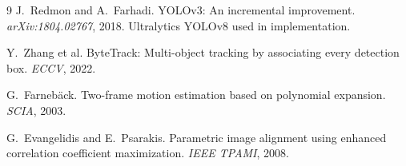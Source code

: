 \documentclass[10pt,twocolumn,letterpaper]{article}
\begin{document}
\begin{thebibliography}{9}
J.~Redmon and A.~Farhadi.
YOLOv3: An incremental improvement.
\emph{arXiv:1804.02767}, 2018.
Ultralytics YOLOv8 used in implementation.

Y.~Zhang et al.
ByteTrack: Multi-object tracking by associating every detection box.
\emph{ECCV}, 2022.

G.~Farneb{\"a}ck.
Two-frame motion estimation based on polynomial expansion.
\emph{SCIA}, 2003.

G.~Evangelidis and E.~Psarakis.
Parametric image alignment using enhanced correlation coefficient maximization.
\emph{IEEE TPAMI}, 2008.
\end{thebibliography}
\end{document}
